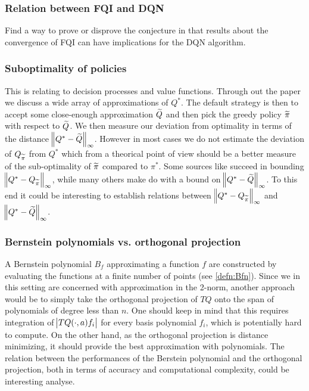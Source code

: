 \subsubsection{Relation between FQI and DQN}
Find a way to prove or disprove the conjecture in  that
results about the convergence of FQI can have implications for the 
DQN algorithm.

\subsubsection{Suboptimality of policies}
This is relating to decision processes and value functions.
Through out the paper we discuss a wide array of
approximations of $Q^*$.
The default strategy is then to accept some close-enough approximation $\widetilde{Q}$
and then pick the greedy policy $\widetilde{\pi}$ with respect to $\widetilde{Q}$.
We then measure our deviation from optimality in terms of the distance
$\norm{Q^* - \widetilde{Q}}_\infty$.
However in most cases we do not estimate the deviation of
$Q_{\widetilde{\pi}}$ from $Q^*$ which from a theorical point of view should be
a better measure of the sub-optimality of $\widetilde{\pi}$ compared to $\pi^*$.
Some sources like  succeed in bounding
$\norm{Q^* - Q_{\widetilde{\pi}}}_\infty$,
while many others make do with a bound on $\norm{Q^* - \widetilde{Q}}_\infty$.
To this end it could be interesting to establish relations
between $\norm{Q^* - Q_{\widetilde{\pi}}}_\infty$ and $\norm{Q^* - \widetilde{Q}}_\infty$.

\subsubsection{Bernstein polynomials vs. orthogonal projection}
A Bernstein polynomial $B_f$ approximating a function $f$
are constructed by evaluating the
functions at a finite number of points (see \cref{defn:Bfn}).
Since we in this setting are concerned with approximation in the 2-norm,
another approach would be to simply take the orthogonal projection of
$TQ$ onto the span of polynomials of degree less than $n$.
One should keep in mind that this requires integration of
$\abs{TQ(\cdot, a) f_i}$ for every basis polynomial $f_i$,
which is potentially hard to compute.
On the other hand, as the orthogonal projection is distance minimizing,
it should provide the best approximation with polynomials.
The relation between the performances of the Berstein polynomial
and the orthogonal projection, both in terms of accuracy and 
computational complexity, could be interesting analyse.

